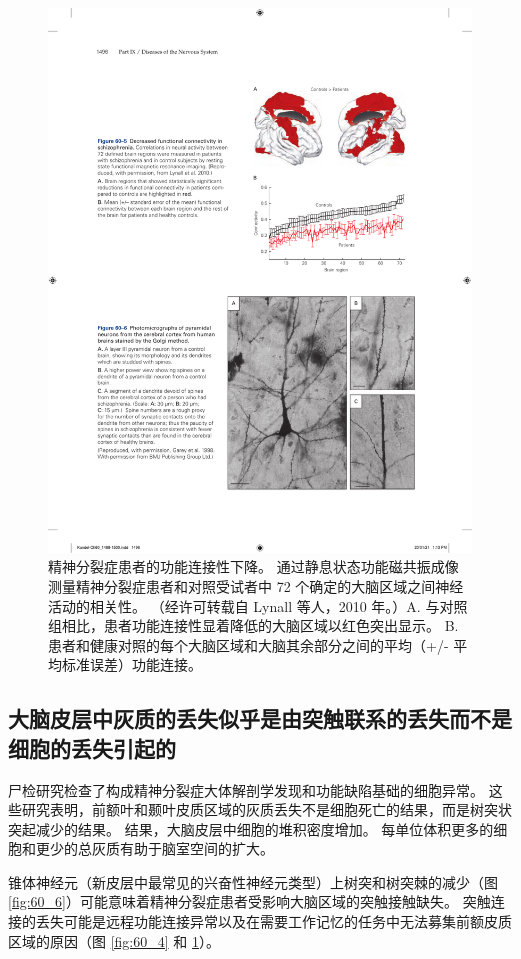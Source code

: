 \begin{figure}[htbp]
	\centering
	\includegraphics[width=0.6\linewidth]{chap60/fig_60_5}
	\caption{精神分裂症患者的功能连接性下降。 通过静息状态功能磁共振成像测量精神分裂症患者和对照受试者中 72 个确定的大脑区域之间神经活动的相关性。 （经许可转载自 Lynall 等人，2010 年。）A. 与对照组相比，患者功能连接性显着降低的大脑区域以红色突出显示。 B. 患者和健康对照的每个大脑区域和大脑其余部分之间的平均（+/- 平均标准误差）功能连接。}
	\label{fig:60_5}
\end{figure}

\subsection{大脑皮层中灰质的丢失似乎是由突触联系的丢失而不是细胞的丢失引起的}
尸检研究检查了构成精神分裂症大体解剖学发现和功能缺陷基础的细胞异常。 这些研究表明，前额叶和颞叶皮质区域的灰质丢失不是细胞死亡的结果，而是树突状突起减少的结果。 结果，大脑皮层中细胞的堆积密度增加。 每单位体积更多的细胞和更少的总灰质有助于脑室空间的扩大。

锥体神经元（新皮层中最常见的兴奋性神经元类型）上树突和树突棘的减少（图 \ref{fig:60_6}）可能意味着精神分裂症患者受影响大脑区域的突触接触缺失。 突触连接的丢失可能是远程功能连接异常以及在需要工作记忆的任务中无法募集前额皮质区域的原因（图 \ref{fig:60_4} 和 \ref{fig:60_5}）。

